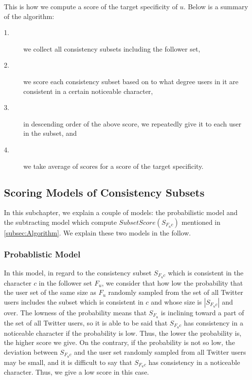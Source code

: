 This is how we compute a score of the target specificity of $u$.  Below
is a summary of the algorithm:

\begin{description}
\item[1.]  we collect all consistency subsets including the follower set,
\item[2.]  we score each consistency subset based on to what degree users
           in it are consistent in a certain noticeable character,
\item[3.]  in descending order of the above score, we repeatedly give it
           to each user in the subset, and
\item[4.]  we take average of scores for a score of the target
           specificity.
\end{description}

\subsection{Scoring Models of Consistency Subsets}
\label{subsec:Scoring}

In this subchapter, we explain a couple of models: the probabilistic
model and the subtracting model which compute
$\mathit{SubsetScore(S_{F_uc})}$ mentioned in \ref{subsec:Algorithm}.
We explain these two models in the follow.

\subsubsection{Probablistic Model}
\label{subsubsec:Probablistic}

In this model, in regard to the consistency subset $S_{F_uc}$ which is
consistent in the character $c$ in the follower set $F_u$, we consider
that how low the probability that the user set of the same size as $F_u$
randomly sampled from the set of all Twitter users includes the subset
which is consistent in $c$ and whose size is $|S_{F_uc}|$ and over.
The lowness of the probability means that $S_{F_u}$ is inclining toward
a part of the set of all Twitter users, so it is able to be said that
$S_{F_uc}$ has consistency in a noticeable character if the probability
is low.  Thus, the lower the probability is, the higher score we give.
On the contrary, if the probability is
not so low,  the deviation between $S_{F_uc}$ and the user set randomly
sampled from all Twitter users may be small, and it is difficult to say
that $S_{F_uc}$ has consistency in a noticeable character.  Thus, we
give a low score in this case.

